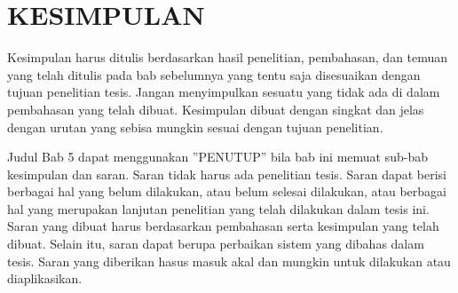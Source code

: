 \chapter{KESIMPULAN}

Kesimpulan harus ditulis berdasarkan hasil penelitian, pembahasan, dan temuan yang telah ditulis pada bab sebelumnya yang tentu saja disesuaikan dengan tujuan penelitian tesis. Jangan menyimpulkan sesuatu yang tidak ada di dalam pembahasan yang telah dibuat. Kesimpulan dibuat dengan singkat dan jelas dengan urutan yang sebisa mungkin sesuai dengan tujuan penelitian. 

Judul Bab 5 dapat menggunakan ”PENUTUP” bila bab ini memuat sub-bab kesimpulan dan saran. Saran tidak harus ada penelitian tesis. Saran dapat berisi berbagai hal yang belum dilakukan, atau belum selesai dilakukan, atau berbagai hal yang merupakan lanjutan penelitian yang telah dilakukan dalam tesis ini. Saran yang dibuat harus berdasarkan pembahasan serta kesimpulan yang telah dibuat. Selain itu, saran dapat berupa perbaikan sistem yang dibahas dalam tesis. Saran yang diberikan hasus masuk akal dan mungkin untuk dilakukan atau diaplikasikan.